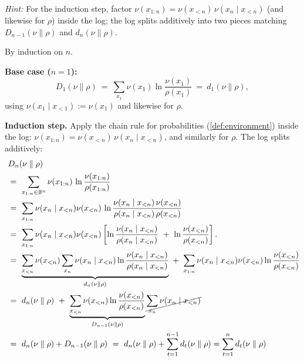 \documentclass[fontsize=11pt, parskip=half]{scrartcl}
\theoremstyle{definition}
\newenvironment{solution}{%
    \begin{tcolorbox}[colback=black!5!white, colframe=black!50!white,
      title={\textbf{Solution}}, fonttitle=\normalfont, breakable]
  }{\end{tcolorbox}}
\newenvironment{solution}{\expandafter\comment}{\expandafter\endcomment}
\begin{document}
\textit{Hint:} For the induction step, factor $\nu(x_{1:n}) = \nu(x_{<n})\,\nu(x_n \mid x_{<n})$ (and likewise for $\rho$) inside the log; the log splits additively into two pieces matching $D_{n-1}(\nu \parallel \rho)$ and $d_n(\nu \parallel \rho)$.

\begin{solution}
By induction on $n$.

\textbf{Base case ($n = 1$):}
\[
  D_1(\nu \parallel \rho) ~=~ \sum_{x_1} \nu(x_1) \ln \frac{\nu(x_1)}{\rho(x_1)} ~=~ d_1(\nu \parallel \rho),
\]
using $\nu(x_1 \mid x_{<1}) := \nu(x_1)$ and likewise for $\rho$.

\textbf{Induction step.} Apply the chain rule for probabilities (\cref{def:environment}) inside the log: $\nu(x_{1:n}) = \nu(x_{<n})\,\nu(x_n \mid x_{<n})$, and similarly for $\rho$. The log splits additively:
\begin{align*}
  & D_n(\nu \parallel \rho) \\
  ~&=~ \sum_{x_{1:n} \in \mathbb{B}^n} \nu(x_{1:n}) \,\ln \frac{\nu(x_{1:n})}{\rho(x_{1:n})} \\
  ~&=~ \sum_{x_{1:n}} \nu(x_n \mid x_{<n}) \nu(x_{<n}) \,\ln \frac{\nu(x_n \mid x_{<n})\,\nu(x_{<n})}
  {\rho(x_n \mid x_{<n})\,\rho(x_{<n})} \\
  ~&=~ \sum_{x_{1:n}} \nu(x_n \mid x_{<n}) \nu(x_{<n}) 
  \left[\ln \frac{\nu(x_n \mid x_{<n})}{\rho(x_n \mid x_{<n})} ~+~ \ln \frac{\nu(x_{<n})}{\rho(x_{<n})}\right]. \\
  ~&=~ \underbrace{\sum_{x_{<n}} \nu(x_{<n}) \sum_{x_n} \nu(x_n \mid x_{<n})  \ln \frac{\nu(x_n \mid x_{<n})}{\rho(x_n \mid x_{<n})} }_{d_n(\nu \parallel \rho)} ~+~
  \sum_{x_{1:n}} \nu(x_n \mid x_{<n}) \nu(x_{<n}) \ln \frac{\nu(x_{<n})}{\rho(x_{<n})} \\
  ~&=~ d_n(\nu \parallel \rho) ~+~
  \underbrace{\sum_{x_{<n}}  \nu(x_{<n}) \ln \frac{\nu(x_{<n})}{\rho(x_{<n})}}_{D_{n-1}(\nu \parallel \rho)} \cancel{\sum_{x_n} \nu(x_n \mid x_{<n})} \\
  ~&=~ d_n(\nu \parallel \rho) + D_{n-1}(\nu \parallel \rho) 
  ~=~ d_n(\nu \parallel \rho) + \sum_{t=1}^{n-1} d_t(\nu \parallel \rho)  = \sum_{t=1}^{n} d_t(\nu \parallel \rho)
\end{align*}
\end{solution}
\end{document}
